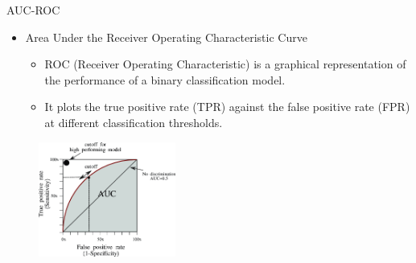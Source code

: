\documentclass[serif, aspectratio=169]{beamer}
\begin{document}
\begin{frame}{AUC-ROC}
    \begin{itemize}
        \item Area Under the Receiver Operating Characteristic Curve
        \begin{itemize}
            \item ROC (Receiver Operating Characteristic) is a graphical representation of the performance of a binary classification model.
            \item It plots the true positive rate (TPR) against the false positive rate (FPR) at different classification thresholds.
        \end{itemize}
        
    \end{itemize}
    
    \begin{figure}[h]
            \centering
            
            \includegraphics[width=0.4\textwidth]{pic/AUC.png}
            \end{figure}
    
    \vfill 
    
    
\end{frame}
\end{document}
